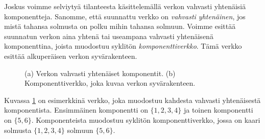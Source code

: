 Joskus voimme selviytyä tilanteesta käsittelemällä
verkon vahvasti yhtenäisiä komponentteja.
Sanomme, että suunnattu verkko on \emph{vahvasti yhtenäinen},
jos mistä tahansa solmusta on polku mihin tahansa solmuun.
Voimme esittää suunnatun verkon aina yhtenä tai
useampana vahvasti yhtenäisenä komponenttina,
joista muodostuu syklitön \emph{komponenttiverkko}.
Tämä verkko esittää alkuperäisen verkon syvärakenteen.

\begin{figure}
\center
\begin{center}
\end{center}
\caption{(a) Verkon vahvasti yhtenäiset komponentit.
(b) Komponenttiverkko, joka kuvaa verkon syvärakenteen.}
\label{fig:vahkom}
\end{figure}

Kuvassa \ref{fig:vahkom} on esimerkkinä verkko, joka muodostuu
kahdesta vahvasti yhtenäisestä komponentista.
Ensimmäinen komponentti on $\{1,2,3,4\}$
ja toinen komponentti on $\{5,6\}$.
Komponenteista muodostuu syklitön komponenttiverkko,
jossa on kaari solmusta $\{1,2,3,4\}$ solmuun $\{5,6\}$.

